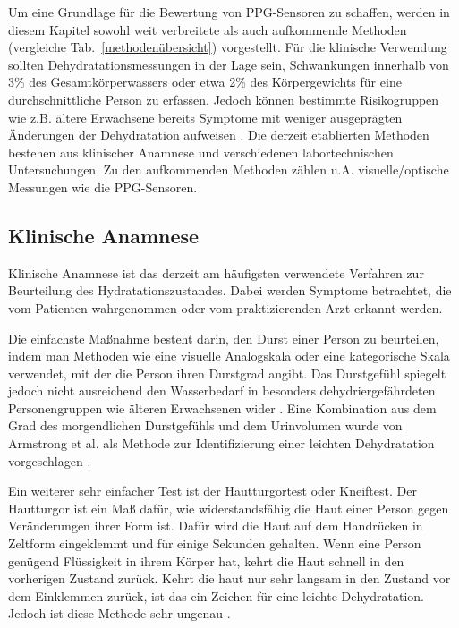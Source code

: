 \documentclass[10pt,a4paper,headinclude,twoside, plainheadsepline, open=right, numbers=noenddot, twocolumn]{article}
\begin{document}
Um eine Grundlage für die Bewertung von PPG-Sensoren zu schaffen, werden in diesem Kapitel sowohl weit verbreitete als auch aufkommende Methoden (vergleiche Tab.~\ref{methodenübersicht}) vorgestellt.
Für die klinische Verwendung sollten Dehydratationsmessungen in der Lage sein, Schwankungen innerhalb von 3\% des Gesamtkörperwassers oder etwa
2\% des Körpergewichts für eine durchschnittliche Person zu erfassen.
Jedoch können bestimmte Risikogruppen wie z.B. ältere Erwachsene bereits Symptome mit weniger ausgeprägten Änderungen der Dehydratation aufweisen \cite{garret2018engineering}.
Die derzeit etablierten Methoden bestehen aus klinischer Anamnese und verschiedenen labortechnischen Untersuchungen.
Zu den aufkommenden Methoden zählen u.A. visuelle/optische Messungen wie die PPG-Sensoren.

\subsection{Klinische Anamnese}
\label{klinische anamnese}

Klinische Anamnese ist das derzeit am häufigsten verwendete Verfahren zur Beurteilung des Hydratationszustandes.
Dabei werden Symptome betrachtet, die vom Patienten wahrgenommen oder vom praktizierenden Arzt erkannt werden.
 
Die einfachste Maßnahme besteht darin, den Durst einer Person zu beurteilen, indem man Methoden wie eine visuelle Analogskala oder eine kategorische Skala verwendet, mit der die Person ihren Durstgrad angibt.
Das Durstgefühl spiegelt jedoch nicht ausreichend den Wasserbedarf in besonders dehydriergefährdeten Personengruppen wie älteren Erwachsenen wider \cite{garret2018engineering}.
Eine Kombination aus dem Grad des morgendlichen Durstgefühls und dem Urinvolumen wurde von Armstrong et al. als Methode zur Identifizierung einer leichten Dehydratation vorgeschlagen \cite{armstrong2013novel}.

Ein weiterer sehr einfacher Test ist der Hautturgortest oder Kneiftest. 
Der Hautturgor ist ein Maß dafür, wie widerstandsfähig die Haut einer Person gegen Veränderungen ihrer Form ist.
Dafür wird die Haut auf dem Handrücken in Zeltform eingeklemmt und für einige Sekunden gehalten.
Wenn eine Person genügend Flüssigkeit in ihrem Körper hat, kehrt die Haut schnell in den vorherigen Zustand zurück.
Kehrt die haut nur sehr langsam in den Zustand vor dem Einklemmen zurück, ist das ein Zeichen für eine leichte Dehydratation.
Jedoch ist diese Methode sehr ungenau \cite{suryadevara2015towards}.
\end{document}
